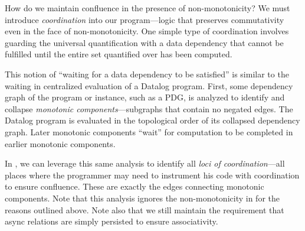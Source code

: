 
How do we maintain confluence in the presence of non-monotonicity?  We must
introduce {\em coordination} into our program---logic that preserves
commutativity even in the face of non-monotonicity.  One simple type of
coordination involves guarding the universal quantification with a data
dependency that cannot be fulfilled until the entire set quantified over has
been computed.

This notion of ``waiting for a data dependency to be satisfied'' is similar to
the waiting in centralized evaluation of a Datalog program.  First, some
dependency graph of the program or instance, such as a PDG, is analyzed to
identify and collapse {\em monotonic components}---subgraphs that contain no
negated edges.  The Datalog program is evaluated in the topological order of
its collapsed dependency graph.  Later monotonic components ``wait'' for
computation to be completed in earlier monotonic components.  

In \lang, we can leverage this same analysis to identify all {\em loci of
coordination}---all places where the programmer may need to instrument his code
with coordination to ensure confluence.  These are exactly the edges connecting
monotonic components.  Note that this analysis ignores the non-monotonicity in
 for the reasons outlined above.  Note also that we still
maintain the requirement that async relations are simply persisted to ensure
associativity. 


